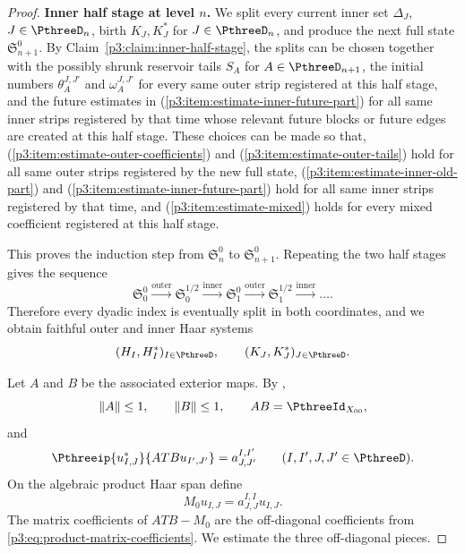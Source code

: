 \documentclass[11pt,reqno]{amsart}
\makeatletter
\theoremstyle{plain}
\theoremstyle{definition}
\newcounter{problempaper}
\newenvironment{problempaperbody}{%
  \setcounter{subsection}{0}%
  \setcounter{subsubsection}{0}%
  \setcounter{paragraph}{0}%
  \renewcommand{\thesubsection}{\arabic{subsection}}%
  \renewcommand{\thesubsubsection}{\thesubsection.\arabic{subsubsection}}%
  \renewcommand{\theparagraph}{\thesubsubsection.\arabic{paragraph}}%
  \let\problem@outersection\section
  \let\problem@outersubsection\subsection
  \let\problem@outersubsubsection\subsubsection
  \let\problem@outerparagraph\paragraph
  \let\section\problem@papersection
  \let\subsection\problem@papersubsection
  \let\subsubsection\problem@papersubsubsection
}{%
  \let\section\problem@outersection
  \let\subsection\problem@outersubsection
  \let\subsubsection\problem@outersubsubsection
  \let\paragraph\problem@outerparagraph
}
\newcommand{\problem@target}[2]{%
  \hypertarget{problem-\theproblempaper-#1-#2}{}%
}
\newcommand{\problem@paperheading}[3]{%
  \par\bigskip
  \problem@target{#1}{#2}%
  \noindent{\large\bfseries #2.\quad #3\par}%
  \nobreak\smallskip
}
\newcommand{\problem@papersubheading}[3]{%
  \par\medskip
  \problem@target{#1}{#2}%
  \noindent{\normalsize\bfseries #2.\quad #3\par}%
  \nobreak\smallskip
}
\newcommand{\problem@papersubsubheading}[3]{%
  \par\smallskip
  \problem@target{#1}{#2}%
  \noindent{\normalsize\itshape #2.\quad #3.\ }%
}
\def\problem@papersection{%
  \@ifstar{\problem@papersectionstar}{\problem@papersectionnostar}%
}
\def\problem@papersectionstar#1{%
  \par\bigskip\noindent{\large\bfseries #1\par}\nobreak\smallskip
}
\def\problem@papersectionnostar#1{%
  \refstepcounter{subsection}%
  \setcounter{subsubsection}{0}%
  \setcounter{paragraph}{0}%
  \problem@paperheading{section}{\thesubsection}{#1}%
  \problem@writecontentsline{section}{\thesubsection}{#1}%
}
\def\problem@papersubsection{%
  \@ifstar{\problem@papersubsectionstar}{\problem@papersubsectionnostar}%
}
\def\problem@papersubsectionstar#1{%
  \par\medskip\noindent{\normalsize\bfseries #1\par}\nobreak\smallskip
}
\def\problem@papersubsectionnostar#1{%
  \refstepcounter{subsubsection}%
  \setcounter{paragraph}{0}%
  \problem@papersubheading{subsection}{\thesubsubsection}{#1}%
  \problem@writecontentsline{subsection}{\thesubsubsection}{#1}%
}
\def\problem@papersubsubsection{%
  \@ifstar{\problem@papersubsubsectionstar}{\problem@papersubsubsectionnostar}%
}
\def\problem@papersubsubsectionstar#1{%
  \par\smallskip\noindent{\normalsize\itshape #1.\ }%
}
\def\problem@papersubsubsectionnostar#1{%
  \refstepcounter{paragraph}%
  \problem@papersubsubheading{subsubsection}{\theparagraph}{#1}%
  \problem@writecontentsline{subsubsection}{\theparagraph}{#1}%
}
\newcommand{\problem@writecontentsline}[3]{%
  \begingroup
  \protected@write\@auxout{}{%
    \string\problemcontentsentry{\theproblempaper}{#1}{#2}{#3}{\thepage}%
  }%
  \endgroup
}
\newcommand{\problemcontentsentry}[5]{%
  \@ifundefined{problemcontents@#1}{%
    \expandafter\gdef\csname problemcontents@#1\endcsname{}%
  }{}%
  \expandafter\g@addto@macro\csname problemcontents@#1\endcsname{%
    \problemcontentsline{#1}{#2}{#3}{#4}{#5}%
  }%
}
\newcommand{\problemcontentslink}[4]{%
  \hyperlink{problem-#1-#2-#3}{#4}%
}
\newcommand{\problemcontentsline}[5]{%
  \ifstrequal{#2}{section}{%
    \par\noindent
    \problemcontentslink{#1}{#2}{#3}{\makebox[2.5em][l]{#3}#4}%
    \nobreak\dotfill
    \problemcontentslink{#1}{#2}{#3}{#5}\par
  }{%
    \ifstrequal{#2}{subsection}{%
      \par\noindent\hspace*{1.5em}%
      \problemcontentslink{#1}{#2}{#3}{\makebox[3.5em][l]{#3}#4}%
      \nobreak\dotfill
      \problemcontentslink{#1}{#2}{#3}{#5}\par
    }{%
      \par\noindent\hspace*{3em}%
      \problemcontentslink{#1}{#2}{#3}{\makebox[4.5em][l]{#3}#4}%
      \nobreak\dotfill
      \problemcontentslink{#1}{#2}{#3}{#5}\par
    }%
  }%
}
\makeatother
\begin{document}
\begin{problempaperbody}
\begin{proof}
\medskip
\noindent\textbf{Inner half stage at level $n$.} We split every current inner set $\Delta_J$, $J\in\PthreeD_n$, birth $K_J,K_J^*$ for $J\in\PthreeD_n$, and produce the next full state $\mathfrak S_{n+1}^0$. By Claim~\ref{p3:claim:inner-half-stage}, the splits can be chosen together with the possibly shrunk reservoir tails $S_A$ for $A\in\PthreeD_{n+1}$, the initial numbers $\theta_A^{J,J'}$ and $\omega_A^{J,J'}$ for every same outer strip registered at this half stage, and the future estimates in \textup{(\ref{p3:item:estimate-inner-future-part})} for all same inner strips registered by that time whose relevant future blocks or future edges are created at this half stage. These choices can be made so that, \textup{(\ref{p3:item:estimate-outer-coefficients})} and \textup{(\ref{p3:item:estimate-outer-tails})} hold for all same outer strips registered by the new full state, \textup{(\ref{p3:item:estimate-inner-old-part})} and \textup{(\ref{p3:item:estimate-inner-future-part})} hold for all same inner strips registered by that time, and \textup{(\ref{p3:item:estimate-mixed})} holds for every mixed coefficient registered at this half stage.

This proves the induction step from $\mathfrak S_n^0$ to $\mathfrak S_{n+1}^0$. Repeating the two half stages gives the sequence
\begin{equation*}
        \mathfrak S_0^0\xrightarrow{\mathrm{outer}}\mathfrak S_0^{1/2}\xrightarrow{\mathrm{inner}}\mathfrak S_1^0\xrightarrow{\mathrm{outer}}\mathfrak S_1^{1/2}\xrightarrow{\mathrm{inner}}\ldots .
\end{equation*}
Therefore every dyadic index is eventually split in both coordinates, and we obtain faithful outer and inner Haar systems
\begin{equation*}
        (H_I,H_I^*)_{I\in\PthreeD},\qquad (K_J,K_J^*)_{J\in\PthreeD}.
\end{equation*}

Let $A$ and $B$ be the associated exterior maps. By ,
\begin{equation*}
        \|A\|\leq1,\qquad \|B\|\leq1,\qquad AB=\PthreeId_{X_{00}},
\end{equation*}
and
\begin{equation}
\label{p3:eq:compressed-matrix-coefficients}
        \Pthreeip{u_{I,J}^*}{ATB u_{I',J'}}=a_{J,J'}^{I,I'}\qquad(I,I',J,J'\in\PthreeD).
\end{equation}
On the algebraic product Haar span define
\begin{equation*}
        M_0u_{I,J}=a_{J,J}^{I,I}u_{I,J}.
\end{equation*}
The matrix coefficients of $ATB-M_0$ are the off-diagonal coefficients from \eqref{p3:eq:product-matrix-coefficients}. We estimate the three off-diagonal pieces.


\end{proof}
\end{problempaperbody}
\end{document}
